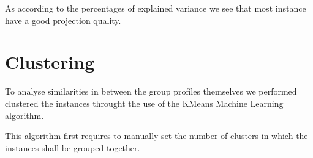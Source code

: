\documentclass[11pt]{article}
\begin{document}
As according to the percentages of explained variance we see that most instance
have a good projection quality.
\section{Clustering}
To analyse similarities in between the group profiles themselves we performed
clustered the instances throught the use of the KMeans Machine Learning
algorithm.\par This algorithm first requires to manually set the number of
clusters in which the instances shall be grouped together.
\end{document}

